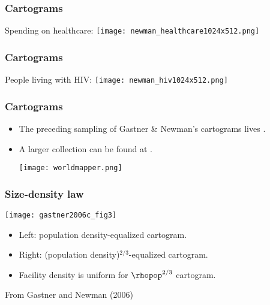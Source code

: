 \begin{frame}
  \frametitle{Cartograms}

  Spending on healthcare:
  \texttt{[image: newman\_healthcare1024x512.png]}
\end{frame}

\begin{frame}
  \frametitle{Cartograms}
  
  People living with HIV:
  \texttt{[image: newman\_hiv1024x512.png]}
\end{frame}


\begin{frame}
  \frametitle{Cartograms}

  \begin{itemize}
  \item<1-> The preceding sampling of Gastner \& Newman's cartograms
    lives .
  \item<1->
    A larger collection can be found
    at .

    \bigskip

    \texttt{[image: worldmapper.png]}
  \end{itemize}

\end{frame}

\begin{frame}
  \frametitle{Size-density law}

  \texttt{[image: gastner2006c\_fig3]}

  \begin{itemize}
  \item <1-> \alert{Left:} population density-equalized cartogram.
  \item <2-> \alert{Right:} (population density)$^{2/3}$-equalized cartogram.
  \item <3-> Facility density is uniform for $\rhopop^{2/3}$ cartogram.
  \end{itemize}
  {\small
    From Gastner and Newman (2006)\cite{gastner2006c}
  }
\end{frame}


